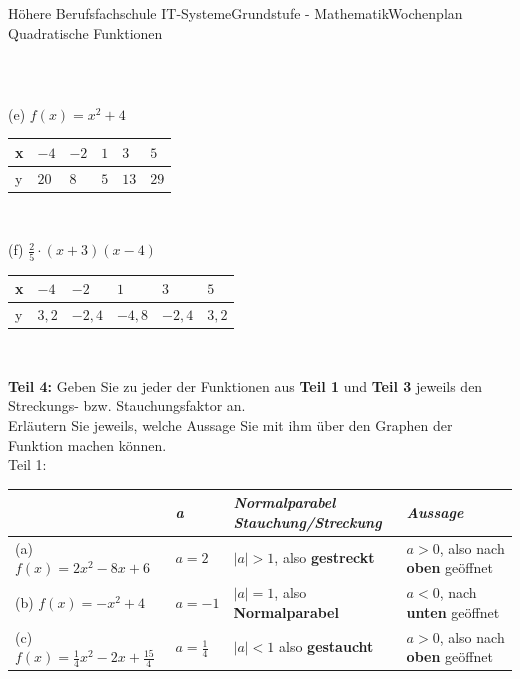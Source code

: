 \documentclass[oneside,openany,headings=optiontotoc,11pt,numbers=noenddot]{scrreprt}
\begin{document}
\begin{worksheet}{Höhere Berufsfachschule IT-Systeme}{Grundstufe - Mathematik}{Wochenplan Quadratische Funktionen}
\begin{framed}
\begin{tabularx}{\textwidth}{X|X|X|X|X|X}
			\end{tabularx}\\
			\par\noindent
			(e) \(f(x) = x^2 + 4\)\\
			\par\noindent
			\begin{tabularx}{\textwidth}{X|X|X|X|X|X}
				x & \(-4\) & \(-2\) & \(1\) & \(3\) & \(5\)\\
				\hline
				y & \(20\) & \(8\) & \(5\) & \(13\) & \(29\)\\
			\end{tabularx}\\
			\par\noindent
			(f) \(\frac{2}{5}\cdot(x+3)(x-4)\)\\
			\par\noindent
			\begin{tabularx}{\textwidth}{X|X|X|X|X|X}
				x & \(-4\) & \(-2\) & \(1\) & \(3\) & \(5\)\\
				\hline
				y & \(3,2\) & \(-2,4\) & \(-4,8\) & \(-2,4\) & \(3,2\)\\
			\end{tabularx}\\
		\end{framed}
		\begin{framed}
			\noindent
			\textbf{Teil 4:} Geben Sie zu jeder der Funktionen aus \textbf{Teil 1} und \textbf{Teil 3} jeweils den Streckungs- bzw. Stauchungsfaktor an.\\
			Erläutern Sie jeweils, welche Aussage Sie mit ihm über den Graphen der Funktion machen können.\\
			Teil 1:\\
			\begin{tabularx}{\textwidth}{X|l|X|X}
				& \textit{a} & \shortstack{\textit{Normalparabel}\\\textit{Stauchung/Streckung}} & \textit{Aussage}\\
				\hline
				(a) \(f(x) = 2x^2 - 8x +6\) & \(a = 2\) & \(|a| > 1\), also \textbf{gestreckt} & \(a > 0\), also nach \textbf{oben} geöffnet \\
				\hline
				(b) \(f(x) = -x^2 + 4\) & \(a = -1\) & \(|a| = 1\), also \textbf{Normalparabel} & \(a < 0\), nach \textbf{unten} geöffnet \\
				\hline
				(c) \(f(x) = \frac{1}{4}x^2 -2x + \frac{15}{4}\) & \(a = \frac{1}{4}\) & \(|a| < 1\) also \textbf{gestaucht} & \(a > 0\), also nach \textbf{oben} geöffnet \\
			\end{tabularx}\\

\end{framed}
\end{worksheet}
\end{document}

